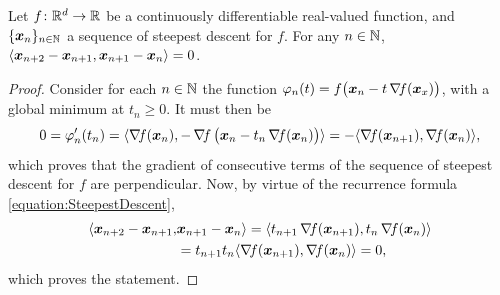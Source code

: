 \begin{theorem}\label{theorem:SteepestDescentPerpSteps}
Let $f \colon \mathbb{R}^d \to \mathbb{R}$ be a continuously differentiable real-valued function, and $\{ \boldsymbol{x}_n \}_{n\in\mathbb{N}}$ a sequence of steepest descent for $f$.  For any $n \in \mathbb{N}$, $\langle \boldsymbol{x}_{n+2} - \boldsymbol{x}_{n+1}, \boldsymbol{x}_{n+1} - \boldsymbol{x}_n \rangle = 0$.
\end{theorem}
\begin{proof}
Consider for each $n \in \mathbb{N}$ the function $\varphi_n(t) = f\big(\boldsymbol{x}_n -t \mathop{\nabla\! {f}}(\boldsymbol{x}_x)\big)$, with a global minimum at $t_n \geq 0$.  It must then be
\begin{equation*}
0 = \varphi_n'(t_n) = \langle \mathop{\nabla\! {f}}(\boldsymbol{x}_n), -\mathop{\nabla\! {f}}\big( \boldsymbol{x}_n - t_n \mathop{\nabla\! {f}}(\boldsymbol{x}_n)\big) \rangle = - \langle \mathop{\nabla\! {f}}(\boldsymbol{x}_{n+1}), \mathop{\nabla\! {f}}(\boldsymbol{x}_n) \rangle,
\end{equation*}
which proves that the gradient of consecutive terms of the sequence of steepest descent for $f$ are perpendicular.  Now, by virtue of the recurrence formula \eqref{equation:SteepestDescent},
\begin{align*}
\langle \boldsymbol{x}_{n+2} - \boldsymbol{x}_{n+1}, &\boldsymbol{x}_{n+1} - \boldsymbol{x}_n \rangle = \langle t_{n+1}\mathop{\nabla\! {f}}(\boldsymbol{x}_{n+1}), t_n \mathop{\nabla\! {f}}(\boldsymbol{x}_n) \rangle \\
&= t_{n+1}t_n \langle \mathop{\nabla\! {f}}(\boldsymbol{x}_{n+1}), \mathop{\nabla\! {f}}(\boldsymbol{x}_n) \rangle = 0, 
\end{align*}
which proves the statement.
\end{proof}

